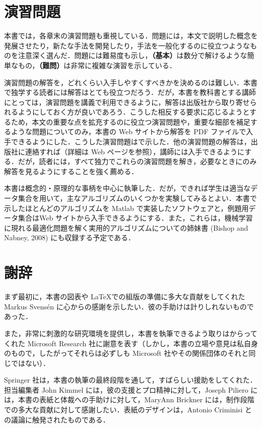 \documentclass[uplatex,a4paper,oneside,openany,dvipdfmx]{jsarticle}
\numberwithin{equation}{section}
\theoremstyle{mystyle} %
\newcommand{\tb}[1]{\textbf{#1}}
\begin{document}
\section*{演習問題}

本書では，各章末の演習問題も重視している．問題には，本文で説明した概念を発展させたり，新たな手法を開発したり，手法を一般化するのに役立つようなものを注意深く選んだ．問題には難易度も示し，\tb{（基本）}は数分で解けるような簡単なもの，\tb{（難問）}は非常に複雑な演習を示している．

演習問題の解答を，どれくらい入手しやすくすべきかを決めるのは難しい．本書で独学する読者には解答はとても役立つだろう．だが，本書を教科書とする講師にとっては，演習問題を講義で利用できるように，解答は出版社から取り寄せられるようにしておく方が良いであろう．こうした相反する要求に応じるようとするため，本文の重要な点を拡充するのに役立つ演習問題や，重要な細部を補足するような問題についてのみ，本書の Web サイトから解答を PDF ファイルで入手できるようにした．こうした演習問題はで示した．他の演習問題の解答は，出版社に連絡すれば（詳細は Web ページを参照），講師には入手できるようにする．だが，読者には，すべて独力でこれらの演習問題を解き，必要なときにのみ解答を見るようにすることを強く薦める．

本書は概念的・原理的な事柄を中心に執筆した．だが，できれば学生は適当なデータ集合を用いて，主なアルゴリズムのいくつかを実験してみるとよい．本書で示したほとんどのアルゴリズムを Matlab で実装したソフトウェアと，例題用データ集合はWeb サイトから入手できるようにする．また，これらは，機械学習に現れる最適化問題を解く実用的アルゴリズムについての姉妹書 (Bishop and Nabney, 2008) にも収録する予定である．

\section*{謝辞}

まず最初に，本書の図表や \LaTeX での組版の準備に多大な貢献をしてくれた Markus Svens\'{e}n に心からの感謝を示したい．彼の手助けは計りしれないものであった．

また，非常に刺激的な研究環境を提供し，本書を執筆できるよう取りはからってくれた Microsoft Research 社に謝意を表す（しかし，本書の立場や意見は私自身のもので，したがってそれらは必ずしも Microsoft 社やその関係団体のそれと同じではない）．

Springer 社は，本書の執筆の最終段階を通して，すばらしい援助をしてくれた．担当編集者 John Kimmel には，彼の支援とプロ精神に対して，Joseph Piliero には，本書の表紙と体裁への手助けに対して，MaryAnn Brickner には，制作段階での多大な貢献に対して感謝したい．表紙のデザインは，Antonio Criminisi との議論に触発されたものである．
\end{document}

